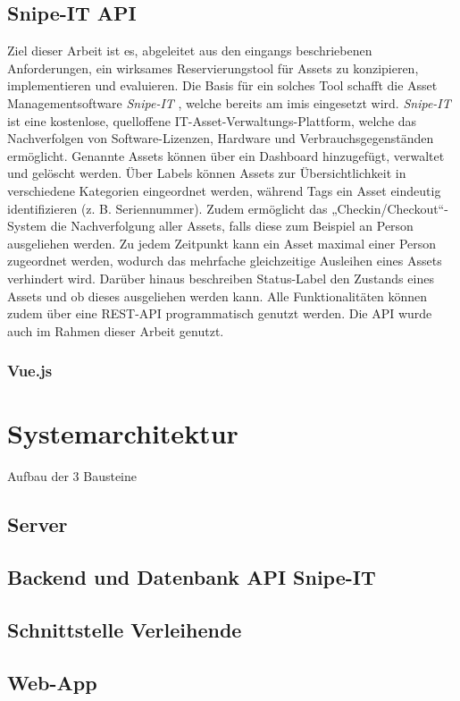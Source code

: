 \subsection{Snipe-IT API}
Ziel dieser Arbeit ist es, abgeleitet aus den eingangs beschriebenen Anforderungen, ein wirksames
Reservierungstool für Assets zu konzipieren, implementieren und evaluieren. Die Basis für ein
solches Tool schafft die Asset Managementsoftware \textit{Snipe-IT} \cite{noauthor_home_nodate},
welche bereits am \ac{imis} eingesetzt wird. \textit{Snipe-IT} ist eine kostenlose, quelloffene
IT-Asset-Verwaltungs-Plattform, welche das Nachverfolgen von Software-Lizenzen, Hardware und
Verbrauchsgegenständen ermöglicht. Genannte Assets können über ein Dashboard hinzugefügt, verwaltet
und gelöscht werden. Über Labels können Assets zur Übersichtlichkeit in verschiedene Kategorien
eingeordnet werden, während Tags ein Asset eindeutig identifizieren (z. B. Seriennummer). Zudem
ermöglicht das „Checkin/Checkout“-System die Nachverfolgung aller Assets, falls diese zum Beispiel
an Person ausgeliehen werden. Zu jedem Zeitpunkt kann ein Asset maximal einer Person zugeordnet
werden, wodurch das mehrfache gleichzeitige Ausleihen eines Assets verhindert wird. Darüber hinaus
beschreiben Status-Label den Zustands eines Assets und ob dieses ausgeliehen werden kann. Alle
Funktionalitäten können zudem über eine REST-API programmatisch genutzt werden. Die API wurde auch im
Rahmen dieser Arbeit genutzt.

\subsubsection{Vue.js}

\section{Systemarchitektur}
Aufbau der 3 Bausteine

\subsection{Server}


\subsection{Backend und Datenbank API Snipe-IT}

\subsection{Schnittstelle Verleihende}

\subsection{Web-App}

